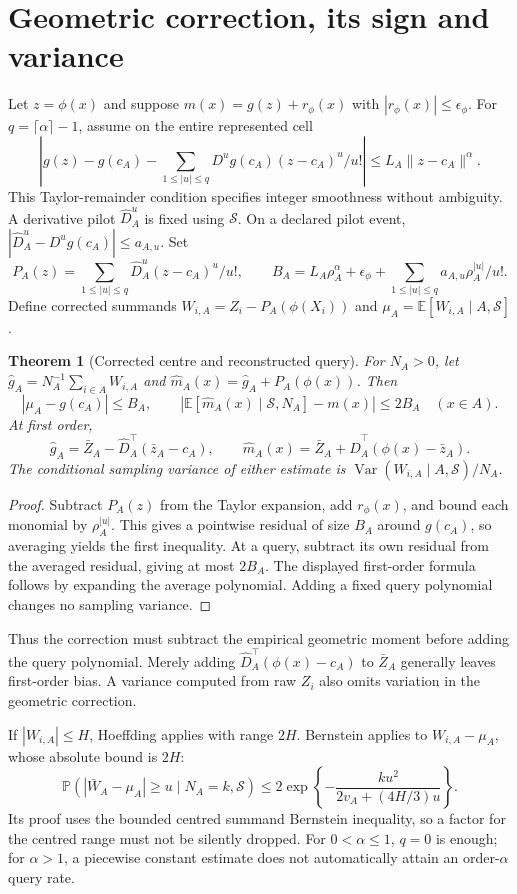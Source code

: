 \documentclass[11pt,a4paper]{article}
\newcommand{\E}{\mathbb E}\newcommand{\Pp}{\mathbb P}
\newcommand{\Var}{\operatorname{Var}}
\numberwithin{equation}{section}
\newtheorem{theorem}{Theorem}[section]
\theoremstyle{definition}\newtheorem{definition}[theorem]{Definition}
\theoremstyle{remark}\newtheorem{remark}[theorem]{Remark}
\begin{document}
\section{Geometric correction, its sign and variance}\label{sec:correction}
Let $z=\phi(x)$ and suppose
$m(x)=g(z)+r_\phi(x)$ with $|r_\phi(x)|\le\epsilon_\phi$.
For $q=\lceil\alpha\rceil-1$, assume on the entire represented cell
\[
 \left|g(z)-g(c_A)-\sum_{1\le|u|\le q}D^ug(c_A)(z-c_A)^u/u!\right|
 \le L_A\|z-c_A\|^\alpha.
\]
This Taylor-remainder condition specifies integer smoothness without ambiguity.
A derivative pilot $\hat D_A^u$ is fixed using $\mathcal S$. On a declared pilot event,
$|\hat D_A^u-D^ug(c_A)|\le a_{A,u}$. Set
\[
 P_A(z)=\sum_{1\le|u|\le q}\hat D_A^u(z-c_A)^u/u!,\qquad
 B_A=L_A\rho_A^\alpha+\epsilon_\phi+
       \sum_{1\le|u|\le q}a_{A,u}\rho_A^{|u|}/u!.
\]
Define corrected summands $W_{i,A}=Z_i-P_A(\phi(X_i))$ and $\mu_A=\E[W_{i,A}\mid A,\mathcal S]$.

\begin{theorem}[Corrected centre and reconstructed query]\label{thm:correction}
For $N_A>0$, let $\hat g_A=N_A^{-1}\sum_{i\in A}W_{i,A}$ and
$\hat m_A(x)=\hat g_A+P_A(\phi(x))$. Then
\[
 |\mu_A-g(c_A)|\le B_A,\qquad
 |\E[\hat m_A(x)\mid\mathcal S,N_A]-m(x)|\le2B_A\quad(x\in A).
\]
At first order,
\[
 \hat g_A=\bar Z_A-\hat D_A^\top(\bar z_A-c_A),\qquad
 \hat m_A(x)=\bar Z_A+\hat D_A^\top(\phi(x)-\bar z_A). \label{eq:firstorder}
\]
The conditional sampling variance of either estimate is
$\Var(W_{i,A}\mid A,\mathcal S)/N_A$.
\end{theorem}
\begin{proof}
Subtract $P_A(z)$ from the Taylor expansion, add $r_\phi(x)$, and bound each monomial by $\rho_A^{|u|}$. This gives a pointwise residual of size $B_A$ around $g(c_A)$, so averaging yields the first inequality. At a query, subtract its own residual from the averaged residual, giving at most $2B_A$. The displayed first-order formula follows by expanding the average polynomial. Adding a fixed query polynomial changes no sampling variance.
\end{proof}
Thus the correction must subtract the empirical geometric moment before adding the query polynomial. Merely adding $\hat D_A^\top(\phi(x)-c_A)$ to $\bar Z_A$ generally leaves first-order bias. A variance computed from raw $Z_i$ also omits variation in the geometric correction.

If $|W_{i,A}|\le H$, Hoeffding applies with range $2H$.
Bernstein applies to $W_{i,A}-\mu_A$, whose absolute bound is $2H$:
\[
 \Pp(|\bar W_A-\mu_A|\ge u\mid N_A=k,\mathcal S)
 \le2\exp\!\left\{-\frac{k u^2}{2v_A+(4H/3)u}\right\}.
\]
Its proof uses the bounded centred summand Bernstein inequality, so a factor for the centred range must not be silently dropped. For $0<\alpha\le1$, $q=0$ is enough; for $\alpha>1$, a piecewise constant estimate does not automatically attain an order-$\alpha$ query rate.
\end{document}
